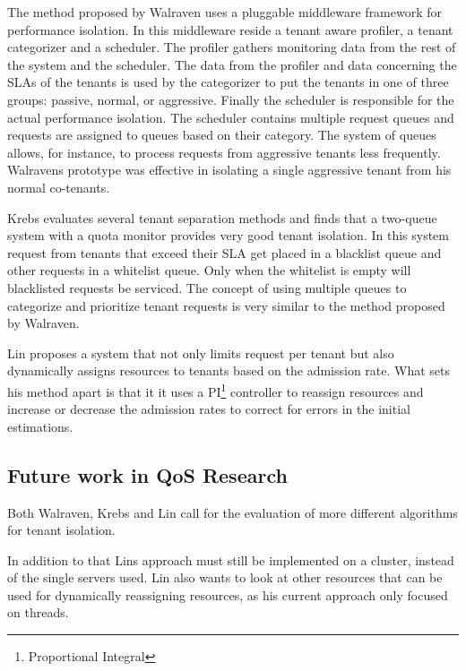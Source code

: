 The method proposed by Walraven uses a pluggable middleware framework for performance isolation.
In this middleware reside a tenant aware profiler, a tenant categorizer and a scheduler. 
The profiler gathers monitoring data from the rest of the system and the scheduler.
The data from the profiler and data concerning the SLAs of the tenants is used by the categorizer to put the tenants in one of three groups: passive, normal, or aggressive.
Finally the scheduler is responsible for the actual performance isolation.
The scheduler contains multiple request queues and requests are assigned to queues based on their category.
The system of queues allows, for instance, to process requests from aggressive tenants less frequently.
Walravens prototype was effective in isolating a single aggressive tenant from his normal co-tenants.

Krebs evaluates several tenant separation methods and finds that a two-queue system with a quota monitor provides very good tenant isolation.
In this system request from tenants that exceed their SLA get placed in a blacklist queue and other requests in a whitelist queue. 
Only when the whitelist is empty will blacklisted requests be serviced.
The concept of using multiple queues to categorize and prioritize tenant requests is very similar to the method proposed by Walraven.

Lin proposes a system that not only limits request per tenant but also dynamically assigns resources to tenants based on the admission rate.
What sets his method apart is that it it uses a PI\footnote{Proportional Integral} controller to reassign resources and increase or decrease the admission rates to correct for errors in the initial estimations.

\subsection{Future work in QoS Research}
Both Walraven, Krebs and Lin call for the evaluation of more different algorithms for tenant isolation.

In addition to that Lins approach must still be implemented on a cluster, instead of the single servers used. Lin also wants to look at other resources that can be used for dynamically reassigning resources, as his current approach only focused on threads.
